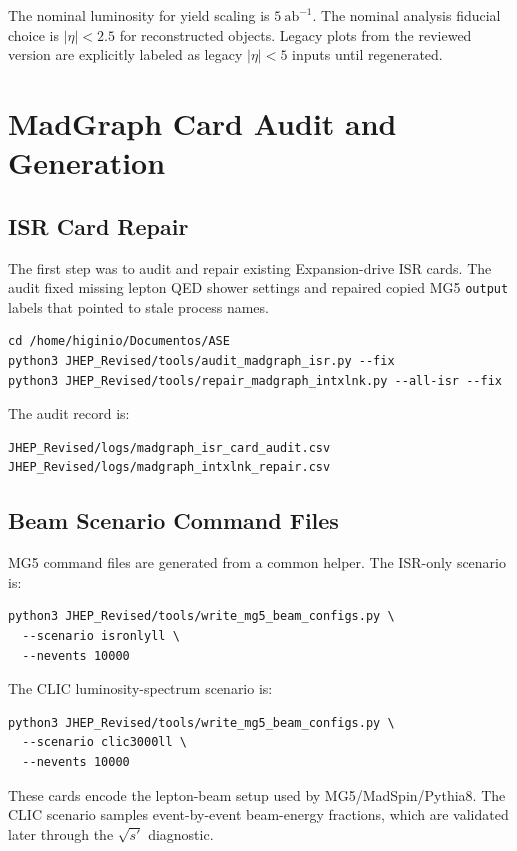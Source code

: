 \documentclass[11pt]{article}
\begin{document}
The nominal luminosity for yield scaling is $5~\mathrm{ab}^{-1}$.  The nominal
analysis fiducial choice is $|\eta|<2.5$ for reconstructed objects.  Legacy plots
from the reviewed version are explicitly labeled as legacy $|\eta|<5$ inputs
until regenerated.

\section{MadGraph Card Audit and Generation}

\subsection{ISR Card Repair}

The first step was to audit and repair existing Expansion-drive ISR cards.  The
audit fixed missing lepton QED shower settings and repaired copied MG5
\texttt{output} labels that pointed to stale process names.

\begin{lstlisting}
cd /home/higinio/Documentos/ASE
python3 JHEP_Revised/tools/audit_madgraph_isr.py --fix
python3 JHEP_Revised/tools/repair_madgraph_intxlnk.py --all-isr --fix
\end{lstlisting}

The audit record is:
\begin{lstlisting}
JHEP_Revised/logs/madgraph_isr_card_audit.csv
JHEP_Revised/logs/madgraph_intxlnk_repair.csv
\end{lstlisting}

\subsection{Beam Scenario Command Files}

MG5 command files are generated from a common helper.  The ISR-only scenario is:

\begin{lstlisting}
python3 JHEP_Revised/tools/write_mg5_beam_configs.py \
  --scenario isronlyll \
  --nevents 10000
\end{lstlisting}

The CLIC luminosity-spectrum scenario is:

\begin{lstlisting}
python3 JHEP_Revised/tools/write_mg5_beam_configs.py \
  --scenario clic3000ll \
  --nevents 10000
\end{lstlisting}

These cards encode the lepton-beam setup used by MG5/MadSpin/Pythia8.  The
CLIC scenario samples event-by-event beam-energy fractions, which are validated
later through the $\sqrt{s'}$ diagnostic.
\end{document}
